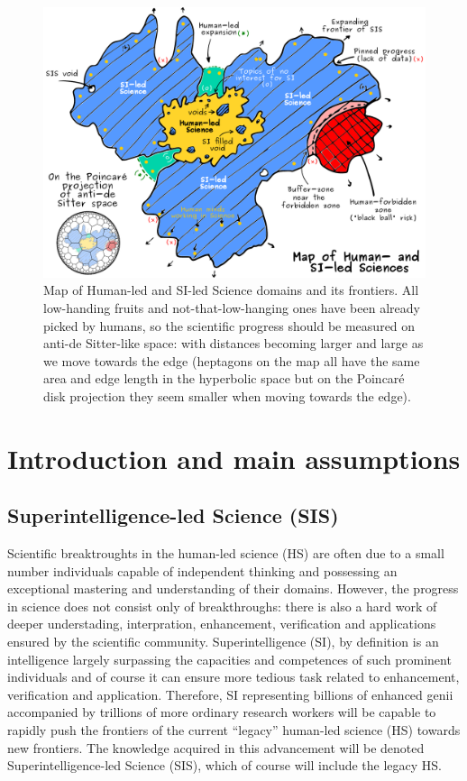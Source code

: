 \documentclass[a4paper,11pt]{article}
\begin{document}
\begin{figure}[htb!]
    \centering\includegraphics[width=1\textwidth]{map}
    \caption{\label{fig:map}Map of Human-led and SI-led Science domains and its frontiers. All low-handing fruits and not-that-low-hanging ones have been already picked by humans, so the scientific progress should be measured on anti-de Sitter-like space: with distances becoming larger and large as we move towards the edge (heptagons on the map all have the same area and edge length in the hyperbolic space but on the Poincaré disk projection they seem smaller when moving towards the edge).}
\end{figure}

\newpage




	\section{Introduction and main assumptions}

        \subsection{Superintelligence-led Science (SIS)}

        Scientific breaktroughts in the human-led science (HS) are often due to a small number individuals capable of independent thinking and possessing an exceptional mastering and understanding of their domains. However, the progress in science does not consist only of breakthroughs: there is also a hard work of deeper understading, interpration, enhancement, verification and applications ensured by the scientific community. 
        Superintelligence (SI), by definition is an intelligence largely surpassing the capacities and competences of such prominent individuals and of course it can ensure more tedious task related to enhancement, verification and application. Therefore, SI representing billions of enhanced genii accompanied by trillions of more ordinary research workers will be capable to rapidly push the frontiers of the current ``legacy'' human-led science (HS) towards new frontiers. The knowledge acquired in this advancement will be denoted Superintelligence-led Science (SIS), which of course will include the legacy HS.
\end{document}
